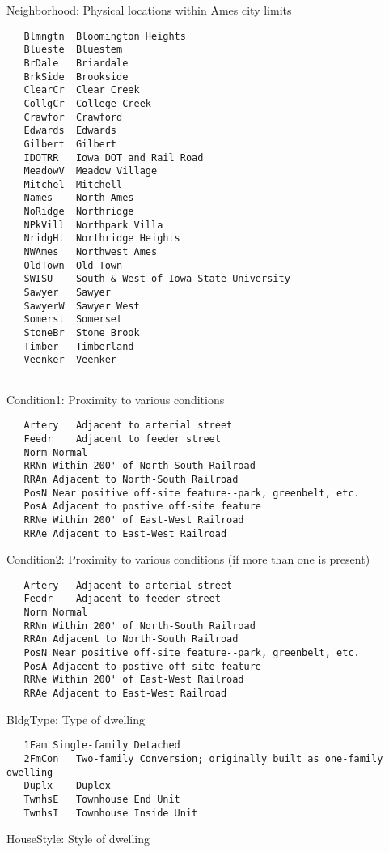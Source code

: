 \documentclass[]{article}
\begin{document}
Neighborhood: Physical locations within Ames city limits

\begin{verbatim}
   Blmngtn  Bloomington Heights
   Blueste  Bluestem
   BrDale   Briardale
   BrkSide  Brookside
   ClearCr  Clear Creek
   CollgCr  College Creek
   Crawfor  Crawford
   Edwards  Edwards
   Gilbert  Gilbert
   IDOTRR   Iowa DOT and Rail Road
   MeadowV  Meadow Village
   Mitchel  Mitchell
   Names    North Ames
   NoRidge  Northridge
   NPkVill  Northpark Villa
   NridgHt  Northridge Heights
   NWAmes   Northwest Ames
   OldTown  Old Town
   SWISU    South & West of Iowa State University
   Sawyer   Sawyer
   SawyerW  Sawyer West
   Somerst  Somerset
   StoneBr  Stone Brook
   Timber   Timberland
   Veenker  Veenker
        
\end{verbatim}

Condition1: Proximity to various conditions

\begin{verbatim}
   Artery   Adjacent to arterial street
   Feedr    Adjacent to feeder street   
   Norm Normal  
   RRNn Within 200' of North-South Railroad
   RRAn Adjacent to North-South Railroad
   PosN Near positive off-site feature--park, greenbelt, etc.
   PosA Adjacent to postive off-site feature
   RRNe Within 200' of East-West Railroad
   RRAe Adjacent to East-West Railroad
\end{verbatim}

Condition2: Proximity to various conditions (if more than one is
present)

\begin{verbatim}
   Artery   Adjacent to arterial street
   Feedr    Adjacent to feeder street   
   Norm Normal  
   RRNn Within 200' of North-South Railroad
   RRAn Adjacent to North-South Railroad
   PosN Near positive off-site feature--park, greenbelt, etc.
   PosA Adjacent to postive off-site feature
   RRNe Within 200' of East-West Railroad
   RRAe Adjacent to East-West Railroad
\end{verbatim}

BldgType: Type of dwelling

\begin{verbatim}
   1Fam Single-family Detached  
   2FmCon   Two-family Conversion; originally built as one-family dwelling
   Duplx    Duplex
   TwnhsE   Townhouse End Unit
   TwnhsI   Townhouse Inside Unit
\end{verbatim}

HouseStyle: Style of dwelling
\end{document}
